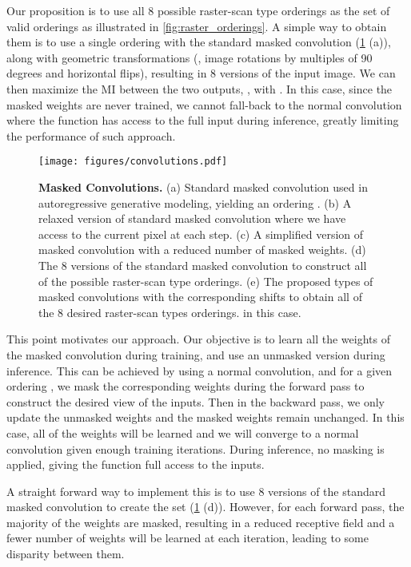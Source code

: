 Our proposition is to use all 8 possible raster-scan type orderings as the set
of valid orderings  as illustrated in \cref{fig:raster_orderings}.
A simple way to obtain them is to use a single ordering  with the
standard masked convolution (\cref{fig:convolutions} (a)),
along with geometric transformations  (\ie, image rotations by
multiples of 90 degrees and horizontal flips), resulting in 8 versions of the input image.
We can then maximize the MI between the
two outputs, \ie,  with .
In this case, since the masked weights are never trained, 
we cannot fall-back to the normal convolution
where the function  has access to the full input during inference,
greatly limiting the performance of such approach.

\begin{figure}[t]
\centering
\texttt{[image: figures/convolutions.pdf]}
\vspace{-0.2in}
\caption{\textbf{Masked Convolutions.} (a) Standard masked convolution used in autoregressive
generative modeling, yielding an ordering . (b) A relaxed version of standard masked convolution
where we have access to the current pixel at each step.
(c) A simplified version of masked convolution with a reduced number  of masked weights.
(d) The 8 versions of the standard masked convolution to construct all of the possible
raster-scan type orderings.
(e) The proposed types of masked convolutions with
the corresponding shifts to obtain all of the 8 desired raster-scan types orderings.
 in this case.}
\label{fig:convolutions}
\vspace{-0.2in}
\end{figure}

This point motivates our approach.
Our objective is to learn all the weights
of the masked convolution during training, and use
an unmasked version during inference.
This can be achieved by using a normal convolution,
and for a given ordering ,
we mask the corresponding weights during the forward
pass to construct the desired view of the inputs.
Then in the backward pass, we only
update the unmasked weights and the masked weights remain unchanged.
In this case, all of the weights will be learned and we will converge to
a normal convolution given enough training iterations.
During inference, no masking is applied, giving
the function  full access to the inputs.

A straight forward way to implement this is to use 8 versions of the standard masked
convolution to create the set  (\cref{fig:convolutions} (d)).
However, for each forward pass,
the majority of the weights are masked, resulting in a reduced receptive field and a fewer number of weights will be learned at each iteration,
leading to some disparity between them. 

